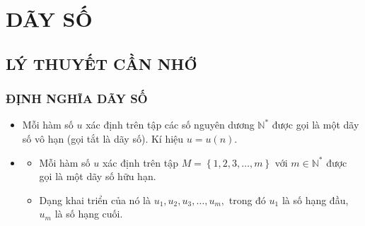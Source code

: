 \section{DÃY SỐ}
\subsection{LÝ THUYẾT CẦN NHỚ}
\subsubsection{ĐỊNH NGHĨA DÃY SỐ}
\begin{itemize}
	\item [\iconMT] Mỗi hàm số $u$ xác định trên tập các số nguyên dương $\mathbb{N}^*$ được gọi là một dãy số vô hạn (gọi tắt là dãy số). Kí hiệu $u=u(n )$.
	\begin{boxkn}
	\end{boxkn}
	\item [\iconMT]  
	\begin{itemize}
		\item [$\bullet$] Mỗi hàm số $u$ xác định trên tập $M=\left\{ 1,2,3,\ldots,m \right\}$ với $m\in \mathbb{N}^*$ được gọi là một dãy số hữu hạn.
		\item [$\bullet$]  Dạng khai triển của nó là ${{u}_{1}},{{u}_{2}},{{u}_{3}},\ldots,{{u}_m},$ trong đó ${{u}_{1}}$ là số hạng đầu, ${{u}_m}$ là số hạng cuối.
	\end{itemize}
\end{itemize}

